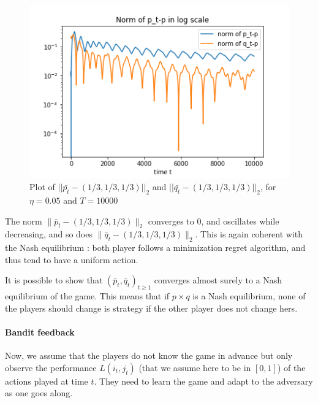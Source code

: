 \begin{enumerate}[resume]
\begin{enumerate}[label=(\alph*)]
	    \begin{solution}
\begin{figure}
\begin{center}
\includegraphics[height=170 pt]{image1/EWA_norm.png} 
\end{center}
\caption{Plot of $||\bar{p_t}-(1/3,1/3,1/3)||_2$ and $||\bar{q_t}-(1/3,1/3,1/3)||_2$, for $\eta=0.05$ and $T=10000$}
\end{figure}

The norm $\|\bar p_t - (1/3,1/3,1/3)\|_2$ converges to $0$, and oscillates while decreasing, and so does $\|\bar q_t - (1/3,1/3,1/3)\|_2$. This is again coherent with the Nash equilibrium : both player follows a minimization regret algorithm, and thus tend to have a uniform action.
        \end{solution}

		\smallskip
		It is possible to show that $(\bar p_t, \bar q_t)_{t\geq 1}$ converges almost surely to a Nash equilibrium of the game. This means that if $p\times q$ is a Nash equilibrium, none of the players should change is strategy if the other player does not change hers. 
	\end{enumerate}
\end{enumerate}

\paragraph{Bandit feedback}
Now, we assume that the players do not know the game in advance but only observe the performance $L(i_t,j_t)$ (that we assume here to be in $[0,1]$) of the actions played at time $t$. They need to learn the game and adapt to the adversary as one goes along.


